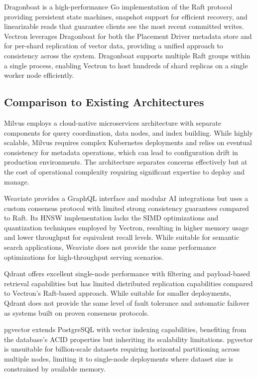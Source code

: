 \documentclass[conference]{IEEEtran}
\begin{document}
Dragonboat \cite{dragonboat} is a high-performance Go implementation of the Raft protocol providing persistent state machines, snapshot support for efficient recovery, and linearizable reads that guarantee clients see the most recent committed writes. Vectron leverages Dragonboat for both the Placement Driver metadata store and for per-shard replication of vector data, providing a unified approach to consistency across the system. Dragonboat supports multiple Raft groups within a single process, enabling Vectron to host hundreds of shard replicas on a single worker node efficiently.

\subsection{Comparison to Existing Architectures}

Milvus \cite{milvus} employs a cloud-native microservices architecture with separate components for query coordination, data nodes, and index building. While highly scalable, Milvus requires complex Kubernetes deployments and relies on eventual consistency for metadata operations, which can lead to configuration drift in production environments. The architecture separates concerns effectively but at the cost of operational complexity requiring significant expertise to deploy and manage.

Weaviate \cite{weaviate} provides a GraphQL interface and modular AI integrations but uses a custom consensus protocol with limited strong consistency guarantees compared to Raft. Its HNSW implementation lacks the SIMD optimizations and quantization techniques employed by Vectron, resulting in higher memory usage and lower throughput for equivalent recall levels. While suitable for semantic search applications, Weaviate does not provide the same performance optimizations for high-throughput serving scenarios.

Qdrant \cite{qdrant} offers excellent single-node performance with filtering and payload-based retrieval capabilities but has limited distributed replication capabilities compared to Vectron's Raft-based approach. While suitable for smaller deployments, Qdrant does not provide the same level of fault tolerance and automatic failover as systems built on proven consensus protocols.

pgvector \cite{pgvector} extends PostgreSQL with vector indexing capabilities, benefiting from the database's ACID properties but inheriting its scalability limitations. pgvector is unsuitable for billion-scale datasets requiring horizontal partitioning across multiple nodes, limiting it to single-node deployments where dataset size is constrained by available memory.
\end{document}
